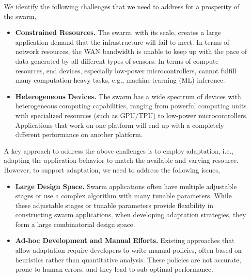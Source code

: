 \documentclass[thesis.tex]{subfiles}
\begin{document}
We identify the following challenges that we need to address for a prosperity of
the swarm,

\begin{itemize}[topsep=5pt, itemsep=2pt, leftmargin=10pt]

\item \textbf{Constrained Resources.} The swarm, with its scale, creates a large
  application demand that the infrastructure will fail to meet. In terms of
  network resources, the WAN bandwidth is unable to keep up with the pace of
  data generated by all different types of sensors. In terms of compute
  resources, end devices, especially low-power microcontrollers, cannot fulfill
  many computation-heavy tasks, e.g., machine learning (ML) inference.

\item \textbf{Heterogeneous Devices.} The swarm has a wide spectrum of devices
  with heterogeneous computing capabilities, ranging from powerful computing
  units with specialized resources (such as GPU/TPU) to low-power
  microcontrollers. Applications that work on one platform will end up with a
  completely different performance on another platform.

\end{itemize}

A key approach to address the above challenges is to employ adaptation, i.e.,
adapting the application behavior to match the available and varying
resource. However, to support adaptation, we need to address the following
issues,

\begin{itemize}[topsep=5pt, itemsep=2pt, leftmargin=10pt]

\item \textbf{Large Design Space.} Swarm applications often have multiple
  adjustable stages or use a complex algorithm with many tunable
  parameters. While these adjustable stages or tunable parameters provide
  flexibility in constructing swarm applications, when developing adaptation
  strategies, they form a large combinatorial design space.

\item \textbf{Ad-hoc Development and Manual Efforts.} Existing approaches that
  allow adaptation require developers to write manual policies, often based on
  heuristics rather than quantitative analysis. These policies are not accurate,
  prone to human errors, and they lead to sub-optimal performance.

\end{itemize}
\end{document}
